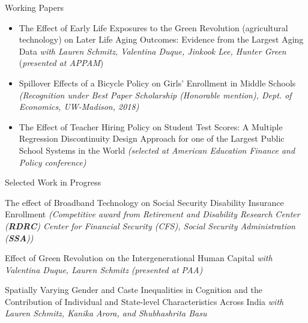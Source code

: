 \documentclass{resume} %
\begin{document}
\begin{rSection}{Working Papers}
\begin{itemize}
\item The Effect of Early Life Exposures to the Green Revolution (agricultural technology) on Later Life Aging Outcomes: Evidence from the Largest Aging Data \textit{with Lauren Schmitz, Valentina Duque, Jinkook Lee, Hunter Green} (\textit{\scriptsize{presented at APPAM}}) 

\item Spillover Effects of a Bicycle Policy on Girls' Enrollment in Middle Schools \textit{\scriptsize{(Recognition under Best Paper Scholarship (Honorable mention), Dept. of Economics, UW-Madison, 2018) }}

\item The Effect of Teacher Hiring Policy on Student Test Scores: A Multiple Regression Discontinuity Design Approach for one of the Largest Public School Systems in the World \textit{\scriptsize{(selected at American Education Finance and Policy conference)}}

\end{itemize}








\end{rSection}


\begin{rSection}{Selected Work in Progress}


\item The effect of Broadband Technology on Social Security Disability Insurance Enrollment \textit{\scriptsize{(Competitive award from Retirement and Disability Research Center (\textbf{RDRC}) Center for Financial Security (CFS), Social Security Administration (\textbf{SSA}))}}

\item Effect of Green Revolution on the Intergenerational Human Capital \textit{with Valentina Duque, Lauren Schmitz} \textit{\scriptsize{(presented at PAA})}

\item Spatially Varying Gender and Caste Inequalities in Cognition and the Contribution of Individual and State-level Characteristics Across India \textit{with Lauren Schmitz, Kanika Arora, and Shubhashrita Basu}


\end{rSection}
\end{document}
